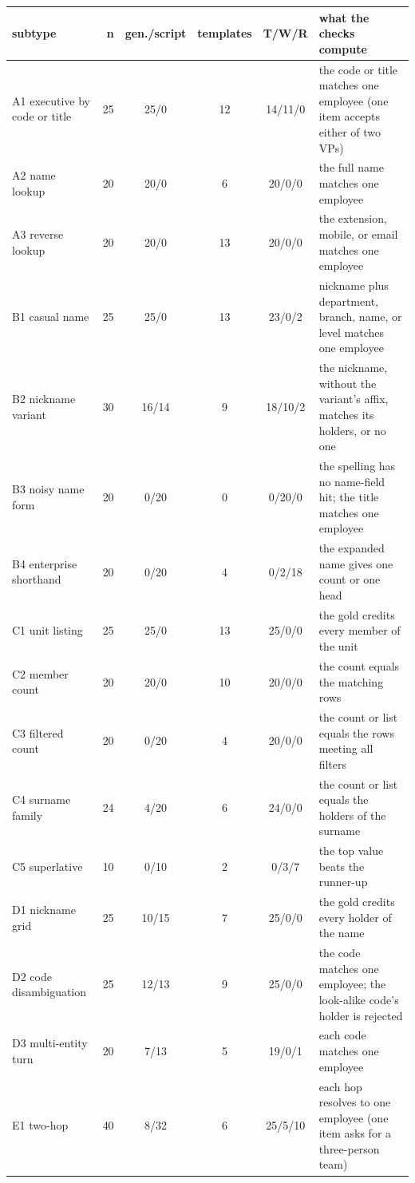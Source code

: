\documentclass[11pt]{article}
\begin{document}
\begin{table}[t]
\centering
\footnotesize
\begin{tabular}{@{}lrccc>{\raggedright\arraybackslash}p{5.5cm}@{}}
\toprule
\textbf{subtype} & \textbf{n} & \textbf{gen./script} & \textbf{templates} & \textbf{T/W/R} & \textbf{what the checks compute} \\
\midrule
A1 executive by code or title & 25 & 25/0 & 12 & 14/11/0 & the code or title matches one employee (one item accepts either of two VPs) \\
A2 name lookup & 20 & 20/0 & 6 & 20/0/0 & the full name matches one employee \\
A3 reverse lookup & 20 & 20/0 & 13 & 20/0/0 & the extension, mobile, or email matches one employee \\
B1 casual name & 25 & 25/0 & 13 & 23/0/2 & nickname plus department, branch, name, or level matches one employee \\
B2 nickname variant & 30 & 16/14 & 9 & 18/10/2 & the nickname, without the variant's affix, matches its holders, or no one \\
B3 noisy name form & 20 & 0/20 & 0 & 0/20/0 & the spelling has no name-field hit; the title matches one employee \\
B4 enterprise shorthand & 20 & 0/20 & 4 & 0/2/18 & the expanded name gives one count or one head \\
C1 unit listing & 25 & 25/0 & 13 & 25/0/0 & the gold credits every member of the unit \\
C2 member count & 20 & 20/0 & 10 & 20/0/0 & the count equals the matching rows \\
C3 filtered count & 20 & 0/20 & 4 & 20/0/0 & the count or list equals the rows meeting all filters \\
C4 surname family & 24 & 4/20 & 6 & 24/0/0 & the count or list equals the holders of the surname \\
C5 superlative & 10 & 0/10 & 2 & 0/3/7 & the top value beats the runner-up \\
D1 nickname grid & 25 & 10/15 & 7 & 25/0/0 & the gold credits every holder of the name \\
D2 code disambiguation & 25 & 12/13 & 9 & 25/0/0 & the code matches one employee; the look-alike code's holder is rejected \\
D3 multi-entity turn & 20 & 7/13 & 5 & 19/0/1 & each code matches one employee \\
E1 two-hop & 40 & 8/32 & 6 & 25/5/10 & each hop resolves to one employee (one item asks for a three-person team) \\

\end{tabular}
\end{table}
\end{document}
